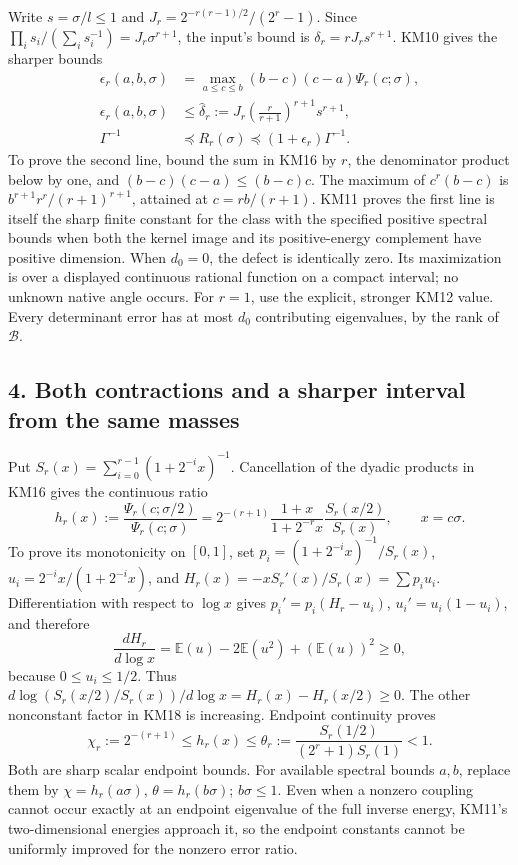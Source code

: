 \documentclass[11pt]{article}
\begin{document}
Write \(s=\sigma/l\le1\) and \(J_r=2^{-r(r-1)/2}/(2^r-1)\). Since \(\prod_i s_i/(\sum_i s_i^{-1})=J_r\sigma^{r+1}\), the input's bound is \(\delta_r=rJ_rs^{r+1}\). KM10 gives the sharper bounds \[
 \begin{split}
 \epsilon_r(a,b,\sigma)&=
 \max_{a\le c\le b}(b-c)(c-a)\Psi_r(c;\sigma),\\
 \epsilon_r(a,b,\sigma)&\le
 \widehat\delta_r:=
 J_r\left(\frac r{r+1}\right)^{r+1}s^{r+1},\\
 \Gamma^{-1}&\preceq R_r(\sigma)
 \preceq(1+\epsilon_r)\Gamma^{-1}.
 \end{split}
 \tag{KM17}
\] To prove the second line, bound the sum in KM16 by \(r\), the denominator product below by one, and \((b-c)(c-a)\le(b-c)c\). The maximum of \(c^r(b-c)\) is \(b^{r+1}r^r/(r+1)^{r+1}\), attained at \(c=rb/(r+1)\). KM11 proves the first line is itself the sharp finite constant for the class with the specified positive spectral bounds when both the kernel image and its positive-energy complement have positive dimension. When \(d_0=0\), the defect is identically zero. Its maximization is over a displayed continuous rational function on a compact interval; no unknown native angle occurs. For \(r=1\), use the explicit, stronger KM12 value. Every determinant error has at most \(d_0\) contributing eigenvalues, by the rank of \(\mathcal B\).

\subsection{4. Both contractions and a sharper interval from the same masses}\label{both-contractions-and-a-sharper-interval-from-the-same-masses}

Put \(S_r(x)=\sum_{i=0}^{r-1}(1+2^{-i}x)^{-1}\). Cancellation of the dyadic products in KM16 gives the continuous ratio \[
 h_r(x):=\frac{\Psi_r(c;\sigma/2)}{\Psi_r(c;\sigma)}
 =2^{-(r+1)}\frac{1+x}{1+2^{-r}x}\frac{S_r(x/2)}{S_r(x)},
 \qquad x=c\sigma.
 \tag{KM18}
\] To prove its monotonicity on \([0,1]\), set \(p_i=(1+2^{-i}x)^{-1}/S_r(x)\), \(u_i=2^{-i}x/(1+2^{-i}x)\), and \(H_r(x)=-xS_r'(x)/S_r(x)=\sum p_i u_i\). Differentiation with respect to \(\log x\) gives \(p_i'=p_i(H_r-u_i)\), \(u_i'=u_i(1-u_i)\), and therefore \[
 \frac{dH_r}{d\log x}
 =\mathbb E(u)-2\mathbb E(u^2)+(\mathbb E(u))^2\ge0,
 \tag{KM19}
\] because \(0\le u_i\le1/2\). Thus \(d\log(S_r(x/2)/S_r(x))/d\log x=H_r(x)-H_r(x/2)\ge0\). The other nonconstant factor in KM18 is increasing. Endpoint continuity proves \[
 \chi_r:=2^{-(r+1)}\le h_r(x)\le
 \theta_r:=\frac{S_r(1/2)}{(2^r+1)S_r(1)}<1 .
 \tag{KM20}
\] Both are sharp scalar endpoint bounds. For available spectral bounds \(a,b\), replace them by \(\chi=h_r(a\sigma)\), \(\theta=h_r(b\sigma)\); \(b\sigma\le1\). Even when a nonzero coupling cannot occur exactly at an endpoint eigenvalue of the full inverse energy, KM11's two-dimensional energies approach it, so the endpoint constants cannot be uniformly improved for the nonzero error ratio.
\end{document}
